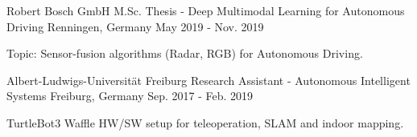 \begin{cventries}
\vspace{0cm}
\cventry
  {Robert Bosch GmbH} %
  {M.Sc. Thesis - Deep Multimodal Learning for Autonomous Driving} %
  {Renningen, Germany} %
  {May 2019 - Nov. 2019} %
  {
    \begin{cvitemone} %
      \item {Topic: Sensor-fusion algorithms (Radar, RGB) for Autonomous Driving.}
    \end{cvitemone}
  }

\vspace{0cm}
\cventry
  {Albert-Ludwigs-Universität Freiburg} %
  {Research Assistant - Autonomous Intelligent Systems} %
  {Freiburg, Germany} %
  {Sep. 2017 - Feb. 2019} %
  {
    \begin{cvitemone} %
      \item {TurtleBot3 Waffle HW/SW setup for teleoperation, SLAM and indoor mapping.}
    \end{cvitemone}
  }



\end{cventries}
